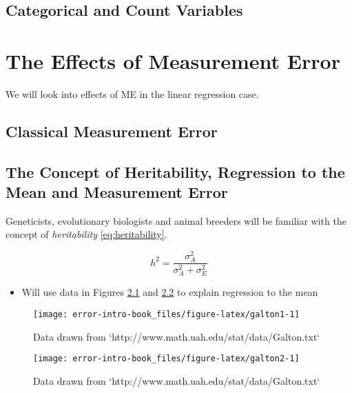\documentclass[]{book}
\providecommand{\tightlist}{%
  \setlength{\itemsep}{0pt}\setlength{\parskip}{0pt}}
\theoremstyle{definition}
\theoremstyle{definition}
\theoremstyle{definition}
\theoremstyle{remark}
\begin{document}
\section{Categorical and Count
Variables}\label{categorical-and-count-variables}

\chapter{The Effects of Measurement
Error}\label{the-effects-of-measurement-error}

We will look into effects of ME in the linear regression case.

\section{Classical Measurement
Error}\label{classical-measurement-error-1}

\section{The Concept of Heritability, Regression to the Mean and
Measurement Error}\label{sec:heritability}

Geneticists, evolutionary biologists and animal breeders will be
familiar with the concept of \emph{heritability} \eqref{eq:heritability}.

\begin{equation}
h^2 = \frac{\sigma_A^2}{\sigma_A^2 + \sigma_E^2}
\label{eq:heritability}
\end{equation}

\begin{itemize}
\tightlist
\item
  Will use data in Figures \ref{fig:galton1} and \ref{fig:galton2} to
  explain regression to the mean
\end{itemize}

\begin{figure}

{\centering \texttt{[image: error-intro-book\_files/figure-latex/galton1-1]} 

}

\caption{Data drawn from `http://www.math.uah.edu/stat/data/Galton.txt`}\label{fig:galton1}
\end{figure}

\begin{figure}

{\centering \texttt{[image: error-intro-book\_files/figure-latex/galton2-1]} 

}

\caption{Data drawn from `http://www.math.uah.edu/stat/data/Galton.txt`}\label{fig:galton2}
\end{figure}
\end{document}
